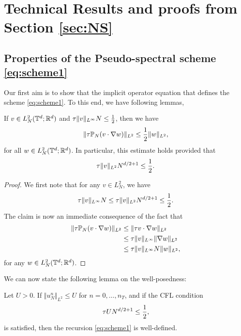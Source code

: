 \documentclass[reqno,a4paper]{amsart}
\begin{document}
\section{Technical Results and proofs from Section {\ref{sec:NS}}}
\subsection{Properties of the Pseudo-spectral scheme {\eqref{eq:scheme1}}}
\label{app:s1}
Our first aim is to show that the implicit operator equation that defines the scheme \eqref{eq:scheme1}. To this end, we have following lemmas,
\begin{lemma} \label{lem:advect1}
If $v\in L^2_N(\mathbb{T}^d;\mathbb{R}^d)$ and ${\tau} \Vert v \Vert_{L^\infty} N  \le \frac12$, then we have \[
\Vert {\tau} \mathbb{P}_N(v \cdot \nabla w) \Vert_{L^2}
\le
\frac12 \Vert w \Vert_{L^2},
\]
for all $w\in L^2_N(\mathbb{T}^d;\mathbb{R}^d)$. In particular, this estimate holds provided that 
\[
{\tau} \Vert v \Vert_{L^2} N^{d/2+1}\le \frac12.
\]
\end{lemma}

\begin{proof}
We first note that for any $v\in L^2_N$, we have
\[
{\tau} \Vert v\Vert_{L^\infty} N
\le
{\tau} \Vert v\Vert_{L^2} N^{d/2+1}
\le \frac12.
\]
The claim is now an immediate consequence of the fact that 
\begin{align*}
\Vert {\tau} \mathbb{P}_N(v \cdot \nabla w) \Vert_{L^2}
&\le
\Vert {\tau} v \cdot \nabla w \Vert_{L^2}
\\
&\le
{\tau} \Vert v \Vert_{L^\infty} \Vert \nabla w \Vert_{L^2}
\\
&\le
{\tau} \Vert v \Vert_{L^\infty}N \Vert w \Vert_{L^2},
\end{align*}
for any $w\in L^2_N(\mathbb{T}^d;\mathbb{R}^d)$. 
\end{proof}

We can now state the following lemma on the well-posedness:

\begin{lemma} \label{lem:welldef1}
Let $U>0$. If $\Vert u^n_N\Vert_{L^2}\le U$ for $n=0,\dots, n_T$, and if the CFL condition 
\begin{align}\label{eq:CFL1}
{\tau} U N^{d/2+1} \le \frac12,
\end{align}
is satisfied, then the recursion \eqref{eq:scheme1} is well-defined.
\end{lemma}
\end{document}

